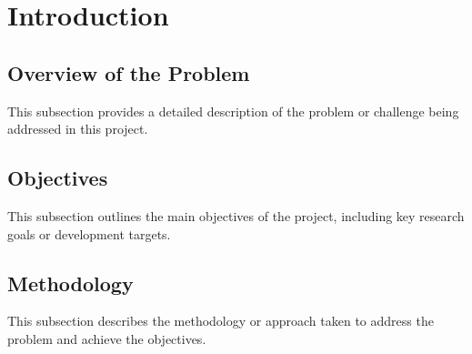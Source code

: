 % 

\section{Introduction}  %

\subsection{Overview of the Problem}
This subsection provides a detailed description of the problem or challenge being addressed in this project.

\subsection{Objectives}
This subsection outlines the main objectives of the project, including key research goals or development targets.

\subsection{Methodology}
This subsection describes the methodology or approach taken to address the problem and achieve the objectives.

\endinput  %
